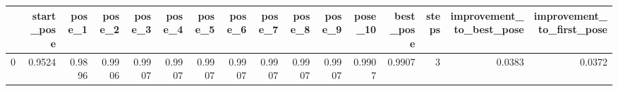 \begin{tabular}{lrrrrrrrrrrrrrrr}
\toprule
{} &  start\_pose &  pose\_1 &  pose\_2 &  pose\_3 &  pose\_4 &  pose\_5 &  pose\_6 &  pose\_7 &  pose\_8 &  pose\_9 &  pose\_10 &  best\_pose &  steps &  improvement\_to\_best\_pose &  improvement\_to\_first\_pose \\
\midrule
0 &      0.9524 &  0.9896 &  0.9906 &  0.9907 &  0.9907 &  0.9907 &  0.9907 &  0.9907 &  0.9907 &  0.9907 &   0.9907 &     0.9907 &      3 &                    0.0383 &                     0.0372 \\
\bottomrule
\end{tabular}
